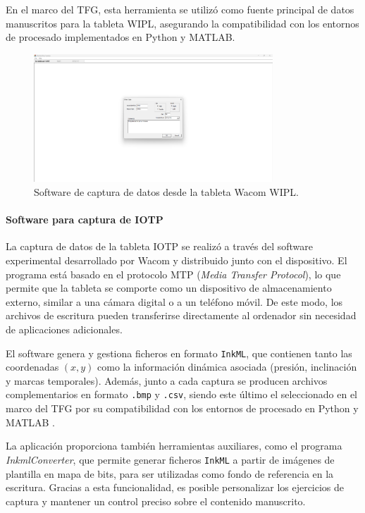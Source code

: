 \documentclass[12pt,a4paper,oneside]{report}
\begin{document}
En el marco del TFG, esta herramienta se utilizó como fuente 
principal de datos manuscritos para la tableta \acrshort{WIPL}, 
asegurando la compatibilidad con los entornos de procesado 
implementados en Python y MATLAB.

\begin{figure}[H]
\centering  
\includegraphics[width=0.8\textwidth]{figuras/interfazWIPL.png}
\caption{Software de captura de datos desde la tableta Wacom \acrshort{WIPL}.}
\label{fig:WacomSoftware} 
\end{figure}

\paragraph{Software para captura de \acrshort{IOTP}}La captura de datos de la tableta \acrshort{IOTP} se realizó a 
través del software experimental desarrollado por Wacom y 
distribuido junto con el dispositivo. El programa está basado en 
el protocolo \acrshort{MTP} (\textit{Media Transfer Protocol}), lo 
que permite que la tableta se comporte como un dispositivo de 
almacenamiento externo, similar a una cámara digital o a un 
teléfono móvil. De este modo, los archivos de escritura pueden 
transferirse directamente al ordenador sin necesidad de 
aplicaciones adicionales\cite{iotp_manual}. 

El software genera y gestiona ficheros en formato 
\texttt{InkML}, que contienen tanto las coordenadas $(x,y)$ como 
la información dinámica asociada (presión, inclinación y 
marcas temporales). Además, junto a cada captura se producen 
archivos complementarios en formato \texttt{.bmp} y 
\texttt{.csv}, siendo este último el seleccionado en el marco del 
TFG por su compatibilidad con los entornos de procesado en 
Python y MATLAB \cite{iotp_manual}. 

La aplicación proporciona también herramientas auxiliares, como 
el programa \textit{InkmlConverter}, que permite generar ficheros 
\texttt{InkML} a partir de imágenes de plantilla en mapa de bits, 
para ser utilizadas como fondo de referencia en la escritura. 
Gracias a esta funcionalidad, es posible personalizar los 
ejercicios de captura y mantener un control preciso sobre el 
contenido manuscrito. 
\end{document}
